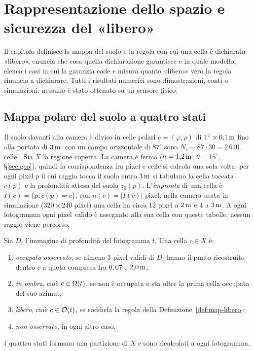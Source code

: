 \section{Rappresentazione dello spazio e sicurezza del «libero»}\label{sec:map}

Il capitolo definisce la mappa del suolo e la regola con cui una cella è dichiarata «libero», enuncia che cosa quella dichiarazione garantisce e in quale modello, elenca i casi in cui la garanzia cade e misura quanto «libero» vero la regola rinuncia a dichiarare. Tutti i risultati numerici sono dimostrazioni, conti o simulazioni: nessuno è stato ottenuto su un sensore fisico.

\subsection{Mappa polare del suolo a quattro stati}\label{sec:map-stati}

Il suolo davanti alla camera è diviso in celle polari $c=(\varphi,\rho)$ di $1^\circ\times0{,}1\,\mathrm{m}$ fino alla portata di $3\,\mathrm{m}$: con un campo orizzontale di $87^\circ$ sono $N_c=87\cdot30=2\,610$ celle . Sia $X$ la regione coperta. La camera è ferma ($h=1{,}2\,\mathrm{m}$, $\theta=15^\circ$, \S\ref{sec:geo}), quindi la corrispondenza fra pixel e celle si calcola una sola volta: per ogni pixel $p$ il cui raggio tocca il suolo entro $3\,\mathrm{m}$ si tabulano la cella toccata $c(p)$ e la profondità attesa del suolo $z_0(p)$. L'\emph{impronta} di una cella è $I(c)=\{p: c(p)=c\}$, con $n(c)=|I(c)|$ pixel; nella camera usata in simulazione ($320\times240$ pixel) una cella ha circa 12 pixel a $2\,\mathrm{m}$ e 4 a $3\,\mathrm{m}$. A ogni fotogramma ogni pixel valido è assegnato alla sua cella con queste tabelle; nessun raggio viene percorso.

\begin{definizione}\label{def:map-stati}
Sia $D_t$ l'immagine di profondità del fotogramma $t$. Una cella $c\in X$ è:
\begin{enumerate}[label=(\roman*)]
\item \emph{occupato osservato}, se almeno 3 pixel validi di $D_t$ hanno il punto ricostruito dentro $c$ a quota compresa fra $0{,}07$ e $2{,}0\,\mathrm{m}$;
\item \emph{in ombra}, cioè $c\in\Omega(t)$, se non è occupata e sta oltre la prima cella occupata del suo azimut;
\item \emph{libero}, cioè $c\in\mathcal{O}(t)$, se soddisfa la regola della Definizione~\ref{def:map-libero};
\item \emph{non osservato}, in ogni altro caso.
\end{enumerate}
I quattro stati formano una partizione di $X$ e sono ricalcolati a ogni fotogramma.
\end{definizione}

